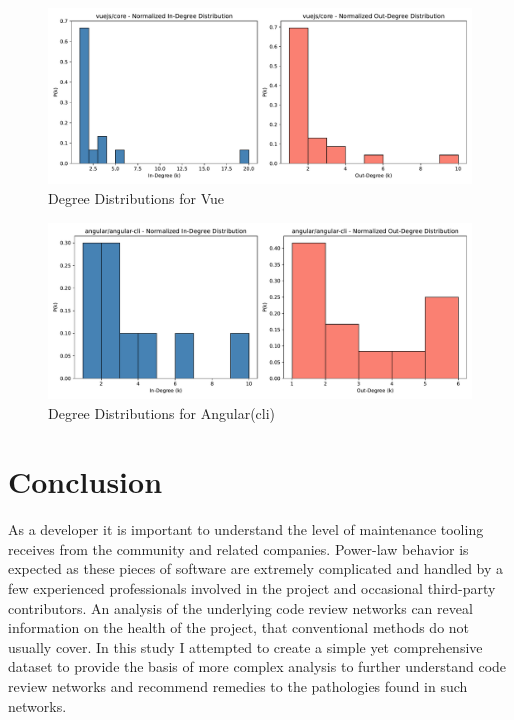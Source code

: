 \documentclass{article}
\begin{document}
\begin{figure}[H]
	\includegraphics[width=\textwidth,left,scale=1.00]{vuejs_core_degree_distribution.pdf}	
	\caption{Degree Distributions for Vue}
\end{figure}

\begin{figure}[H]
	\includegraphics[width=\textwidth,left,scale=1.00]{angular_angular-cli_degree_distribution.pdf}	
	\caption{Degree Distributions for Angular(cli)}
\end{figure}




\section{Conclusion}
As a developer it is important to understand the level of maintenance tooling receives from the community and related companies. Power-law behavior is expected as these pieces of software are extremely complicated and handled by a few experienced professionals involved in the project and occasional third-party contributors. 
An analysis of the underlying code review networks can reveal information on the health of the project, that conventional methods do not usually cover. In this study I attempted to create a simple yet comprehensive dataset to provide the basis of more complex analysis to further understand code review networks and recommend remedies to the pathologies found in such networks.




\end{document}
